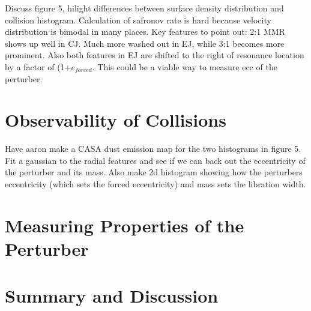 \documentclass[twocolumn]{aastex63}
\begin{document}
Discuss figure 5, hilight differences between surface density distribution and collision histogram. Calculation of safronov rate is hard because velocity distribution is bimodal in many places. Key features to point out: 2:1 MMR shows up well in CJ. Much more washed out in EJ, while 3:1 becomes more prominent. Also both features in EJ are shifted to the right of resonance location by a factor of (1+$e_{forced}$. This could be a viable way to measure ecc of the perturber.

\section{Observability of Collisions} \label{sec:dust}

Have aaron make a CASA dust emission map for the two histograms in figure 5. Fit a gaussian to the radial features and see if we can back out the eccentricity of the perturber and its mass. Also make 2d histogram showing how the perturbers eccentricity (which sets the forced eccentricity) and mass sets the libration width.

\section{Measuring Properties of the Perturber} \label{sec:fitting}

\section{Summary and Discussion} \label{sec:discuss}



\clearpage
\end{document}
